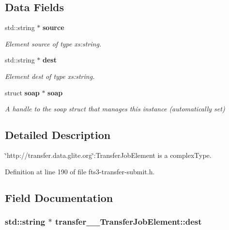 \subsection*{Data Fields}
\begin{DoxyCompactItemize}
\item 
std::string $\ast$ {\bf source}
\begin{DoxyCompactList}\small\item\em Element source of type xs:string. \item\end{DoxyCompactList}\item 
std::string $\ast$ {\bf dest}
\begin{DoxyCompactList}\small\item\em Element dest of type xs:string. \item\end{DoxyCompactList}\item 
struct {\bf soap} $\ast$ {\bf soap}\label{classtransfer____TransferJobElement_a6d4439616ecd6bcee00929a501572abd}

\begin{DoxyCompactList}\small\item\em A handle to the soap struct that manages this instance (automatically set) \item\end{DoxyCompactList}\end{DoxyCompactItemize}


\subsection{Detailed Description}
\char`\"{}http://transfer.data.glite.org\char`\"{}:TransferJobElement is a complexType. 

Definition at line 190 of file fts3-\/transfer-\/submit.h.



\subsection{Field Documentation}
\subsubsection[{dest}]{\setlength{\rightskip}{0pt plus 5cm}std::string $\ast$ {\bf transfer\_\-\_\-TransferJobElement::dest}}\label{classtransfer____TransferJobElement_aa6ad4c72af630c766d440187a81f8f68}



